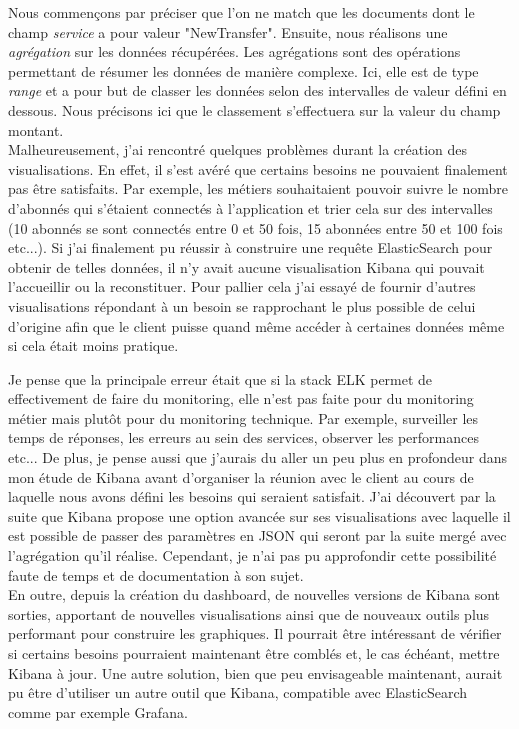 	Nous commençons par préciser que l'on ne match que les documents dont le champ \textit{service} a pour valeur "NewTransfer". Ensuite, nous réalisons une \textit{agrégation} sur les données récupérées. Les agrégations sont des opérations permettant de résumer les données de manière complexe. Ici, elle est de type \textit{range} et a pour but de classer les données selon des intervalles de valeur défini en dessous. Nous précisons ici que le classement s'effectuera sur la valeur du champ montant. \\
	
	Malheureusement, j'ai rencontré quelques problèmes durant la création des visualisations. En effet, il s'est avéré que certains besoins ne pouvaient finalement pas être satisfaits. Par exemple, les métiers souhaitaient pouvoir suivre le nombre d'abonnés qui s'étaient connectés à l'application et trier cela sur des intervalles (10 abonnés se sont connectés entre 0 et 50 fois, 15 abonnées entre 50 et 100 fois etc...). Si j'ai finalement pu réussir à construire une requête ElasticSearch pour obtenir de telles données, il n'y avait aucune visualisation Kibana qui pouvait l'accueillir ou la reconstituer. Pour pallier cela j'ai essayé de fournir d'autres visualisations répondant à un besoin se rapprochant le plus possible de celui d'origine afin que le client puisse quand même accéder à certaines données même si cela était moins pratique.
	
	Je pense que la principale erreur était que si la stack ELK permet de effectivement de faire du monitoring, elle n'est pas faite pour du monitoring métier mais plutôt pour du monitoring technique. Par exemple, surveiller les temps de réponses, les erreurs au sein des services, observer les performances etc... De plus, je pense aussi que j'aurais du aller un peu plus en profondeur dans mon étude de Kibana avant d'organiser la réunion avec le client au cours de laquelle nous avons défini les besoins qui seraient satisfait. J'ai découvert par la suite que Kibana propose une option avancée sur ses visualisations avec laquelle il est possible de passer des paramètres en JSON qui seront par la suite mergé avec l'agrégation qu'il réalise. Cependant, je n'ai pas pu approfondir cette possibilité faute de temps et de documentation à son sujet. \\
	
	En outre, depuis la création du dashboard, de nouvelles versions de Kibana sont sorties, apportant de nouvelles visualisations ainsi que de nouveaux outils plus performant pour construire les graphiques. Il pourrait être intéressant de vérifier si certains besoins pourraient maintenant être comblés et, le cas échéant, mettre Kibana à jour. Une autre solution, bien que peu envisageable maintenant, aurait pu être d'utiliser un autre outil que Kibana, compatible avec ElasticSearch comme par exemple Grafana.